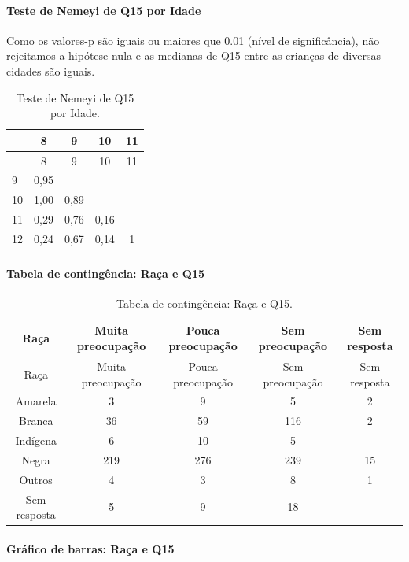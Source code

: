 \documentclass[]{article}
\let\oldparagraph\paragraph
\renewcommand{\paragraph}[1]{\oldparagraph{#1}\mbox{}}
\begin{document}
\hypertarget{teste-de-nemeyi-de-q15-por-idade}{%
\paragraph{Teste de Nemeyi de Q15 por Idade}\label{teste-de-nemeyi-de-q15-por-idade}}

Como os valores-p são iguais ou maiores que 0.01 (nível de significância), não rejeitamos a hipótese nula e as medianas de Q15 entre as crianças de diversas cidades são iguais.

\begin{longtable}[]{@{}lcccc@{}}
\caption{\label{tab:unnamed-chunk-100}Teste de Nemeyi de Q15 por Idade.}\tabularnewline
\toprule
& 8 & 9 & 10 & 11\tabularnewline
\midrule
\endfirsthead
\toprule
& 8 & 9 & 10 & 11\tabularnewline
\midrule
\endhead
9 & 0,95 & & &\tabularnewline
10 & 1,00 & 0,89 & &\tabularnewline
11 & 0,29 & 0,76 & 0,16 &\tabularnewline
12 & 0,24 & 0,67 & 0,14 & 1\tabularnewline
\bottomrule
\end{longtable}

\cleardoublepage

\hypertarget{tabela-de-continguxeancia-rauxe7a-e-q15}{%
\paragraph{Tabela de contingência: Raça e Q15}\label{tabela-de-continguxeancia-rauxe7a-e-q15}}

\begin{longtable}[]{@{}ccccc@{}}
\caption{\label{tab:unnamed-chunk-101}Tabela de contingência: Raça e Q15.}\tabularnewline
\toprule
Raça & Muita preocupação & Pouca preocupação & Sem preocupação & Sem resposta\tabularnewline
\midrule
\endfirsthead
\toprule
Raça & Muita preocupação & Pouca preocupação & Sem preocupação & Sem resposta\tabularnewline
\midrule
\endhead
Amarela & 3 & 9 & 5 & 2\tabularnewline
Branca & 36 & 59 & 116 & 2\tabularnewline
Indígena & 6 & 10 & 5 &\tabularnewline
Negra & 219 & 276 & 239 & 15\tabularnewline
Outros & 4 & 3 & 8 & 1\tabularnewline
Sem resposta & 5 & 9 & 18 &\tabularnewline
\bottomrule
\end{longtable}

\hypertarget{gruxe1fico-de-barras-rauxe7a-e-q15}{%
\paragraph{Gráfico de barras: Raça e Q15}\label{gruxe1fico-de-barras-rauxe7a-e-q15}}
\end{document}
